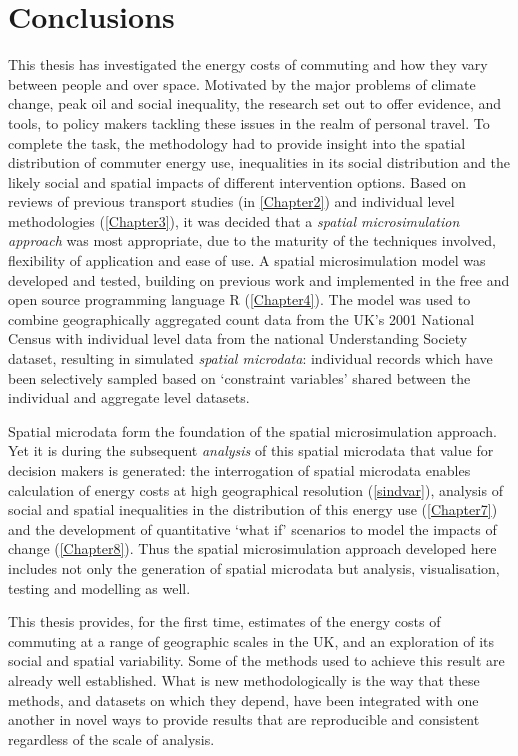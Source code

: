 \documentclass[a4paper, 11pt, twoside]{Thesis}
\begin{document}
 

\chapter{Conclusions} 
\label{Chapter9}
\fancyhead[RE,LO]{\thepage}
This thesis has investigated the energy costs of commuting and how they vary
between people and over space.
Motivated by the major problems of climate change, peak oil and
social inequality, the research set out to offer
evidence, and tools, to policy makers tackling these issues in the realm
of personal travel.
To complete the task, the methodology had to provide insight into the
spatial distribution of commuter energy use,
inequalities in its social distribution and the likely social and spatial
impacts of different intervention options.
Based on reviews of previous transport studies (in \cref{Chapter2})
and individual level methodologies (\cref{Chapter3}), it was decided that
a \emph{spatial microsimulation approach} was most appropriate,
due to the maturity of the techniques involved, flexibility of application and
ease of use.
A spatial microsimulation model was developed and tested, building on previous
work and implemented in the free and open source programming
language R (\cref{Chapter4}). The model
was used to combine geographically aggregated count data from the UK's 2001 National Census
with individual level data from the national Understanding Society dataset,
resulting in simulated \emph{spatial microdata}: individual
records which have been selectively sampled based on `constraint variables' shared
between the individual and aggregate level datasets.

Spatial microdata form the foundation of the spatial microsimulation approach.
Yet it is during the subsequent \emph{analysis} of this spatial microdata that
value for decision makers is generated: the interrogation of spatial microdata enables
calculation of energy costs at high geographical resolution (\cref{sindvar}),
analysis of social and spatial inequalities in the distribution of this energy
use (\cref{Chapter7}) and the development of quantitative
`what if' scenarios to model the impacts of change (\cref{Chapter8}).
Thus the spatial microsimulation approach developed here
includes not only the generation of spatial microdata but
analysis, visualisation, testing and modelling as well.

This thesis provides, for the first time,
estimates of the energy costs of commuting at a range of geographic scales in
the UK, and an exploration of its social and spatial
variability. Some of the methods
used to achieve this result are already well established. What is new
methodologically is the way that these methods, and datasets on which
they depend, have been integrated with one another in novel ways
to provide results that are reproducible
and consistent regardless of the scale of analysis.
\end{document}

